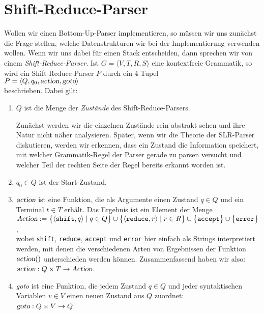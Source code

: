 \section{Shift-Reduce-Parser}
Wollen wir einen Bottom-Up-Parser implementieren, so m\"ussen wir uns zun\"achst die Frage stellen,
welche Datenstrukturen wir bei der Implementierung verwenden wollen.
Wenn wir uns dabei f\"ur einen Stack entscheiden, dann sprechen wir von einem
\emph{Shift-Reduce-Parser}.  Ist $G = \langle V, T, R, S \rangle$ eine kontextfreie Grammatik, so
wird ein Shift-Reduce-Parser $P$ durch ein 4-Tupel
\\[0.2cm]
\hspace*{1.3cm}
$P = \langle Q, q_0, \textsl{action}, \textsl{goto} \rangle$
\\[0.2cm]
beschrieben.  Dabei gilt:
\begin{enumerate}
\item $Q$ ist die Menge der \emph{Zust\"ande} des Shift-Reduce-Parsers.  

      Zun\"achst werden wir die einzelnen Zust\"ande rein abstrakt sehen und ihre Natur nicht n\"aher
      analysieren.  Sp\"ater, wenn wir 
      die Theorie der SLR-Parser diskutieren, werden wir erkennen, dass ein Zustand
      die Information speichert, mit welcher Grammatik-Regel der Parser gerade zu parsen versucht
      und welcher Teil der rechten Seite der Regel bereits erkannt worden ist.
\item $q_0 \in Q$ ist der Start-Zustand.
\item $\textsl{action}$ ist eine Funktion, die als Argumente einen Zustand $q \in Q$
      und ein Terminal $t \in T$ erh\"alt.  Das Ergebnis ist ein Element der Menge
      \\[0.2cm]
      \hspace*{1.3cm}
      $\textsl{Action} :=
       \bigl\{ \pair(\texttt{shift}, q)  \mid q \in Q \bigr\}               \cup 
       \bigl\{ \pair(\texttt{reduce}, r) \mid r \in R \bigr\} \cup 
       \bigl\{ \texttt{accept} \bigr\}                        \cup
       \bigl\{ \texttt{error}  \bigr\}                         $,
      \\[0.2cm]
      wobei \texttt{shift}, \texttt{reduce}, \texttt{accept} und \texttt{error} hier einfach als
      Strings interpretiert werden, mit denen die verschiedenen Arten von Ergebnissen der Funktion
      $\textsl{action}()$ unterschieden werden k\"onnen.  
      Zusammenfassend haben wir also:
      \\[0.2cm]
      \hspace*{1.3cm}
      $\textsl{action}: Q \times T \rightarrow \textsl{Action}$.
\item \textsl{goto} ist eine Funktion, die jedem Zustand $q \in Q$ und jeder syntaktischen Variablen
      $v \in V$ einen neuen Zustand aus $Q$ zuordnet:
      \\[0.2cm]
      \hspace*{1.3cm}
      $\textsl{goto}: Q \times V \rightarrow Q$.
\end{enumerate}
